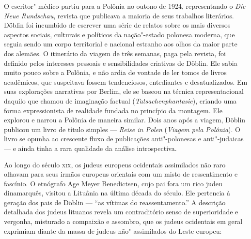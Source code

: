 O escritor"-médico partiu para a Polônia no outono de 1924, representando
o \textit{Die Neue Rundschau}, revista que publicava a maioria de seus
trabalhos literários. Döblin foi incumbido de escrever uma série de
relatos sobre os mais diversos aspectos sociais, culturais e políticos
da nação"-estado polonesa moderna, que seguia sendo um corpo territorial
e nacional estranho aos olhos da maior parte dos alemães. O itinerário
da viagem de três semanas, paga pela revista, foi definido pelos
interesses pessoais e sensibilidades criativas de Döblin. Ele sabia
muito pouco sobre a Polônia, e não ardia de vontade de ler tomos de
livros acadêmicos, que suspeitava fossem tendenciosos, entediantes e
desatualizados. Em suas explorações narrativas por Berlim, ele se baseou
na técnica representacional daquilo que chamou de imaginação factual
(\textit{Tatsachenphantasie}), criando uma forma expressionista de
realidade fundada no princípio da montagem. Ele explorou e narrou a
Polônia de maneira similar. Dois anos após a viagem, Döblin publicou um
livro de título simples --- \textit{Reise in Polen} (\textit{Viagem pela
Polônia}). O livro se opunha ao crescente fluxo de publicações
anti"-polonesas e anti"-judaicas --- e ainda tinha a rara qualidade da
análise introspectiva.

Ao longo do século \textsc{xix}, os judeus europeus ocidentais assimilados não
raro olhavam para seus irmãos europeus orientais com um misto de
ressentimento e fascínio. O etnógrafo Age Meyer Benedictsen, cujo pai
fora um rico judeu dinamarquês, visitou a Lituânia na última década do
século. Ele pertencia à geração dos pais de Döblin --- ``as vítimas do
reassentamento.'' A descrição detalhada dos judeus lituanos revela um
contraditório senso de superioridade e vergonha, misturado a compaixão e
assombro, que os judeus ocidentais em geral exprimiam diante da massa de
judeus não"-assimilados do Leste europeu:

